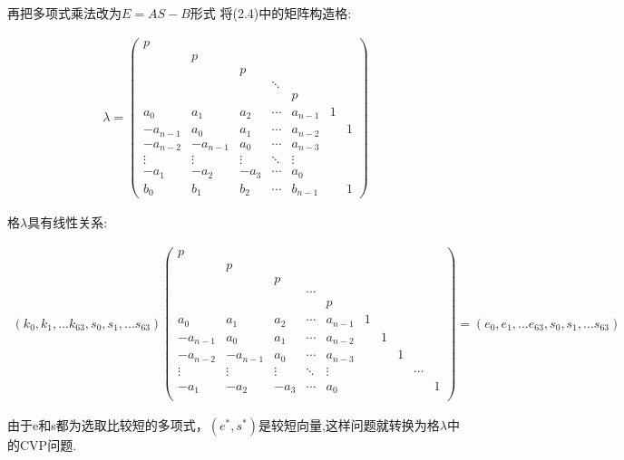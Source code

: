 \documentclass[12pt,a4paper]{article}
\numberwithin{equation}{section}
\begin{document}
再把多项式乘法改为$E=AS-B$形式
将(2.4)中的矩阵构造格:

\begin{align}
	\lambda=
	\left(
	\begin{smallmatrix}
		p        &          &        &        &         &   &   \\
		& p        &        &        &         &   &   \\
		&          & p      &        &         &   &   \\
		&          &        & \ddots &         &   &   \\
		&          &        &        & p       &   &   \\
		a_0      & a_1      & a_2    & \cdots & a_{n-1} & 1 &   \\
		-a_{n-1} & a_0      & a_1    & \cdots & a_{n-2} &   & 1 \\
		-a_{n-2} & -a_{n-1} & a_0    & \cdots & a_{n-3} &   &   \\
		\vdots   & \vdots   & \vdots & \ddots & \vdots  &   &   \\
		-a_1     & -a_2     & -a_3   & \cdots & a_0     &   &   \\
		b_0      & b_1      & b_2    & \cdots & b_{n-1} &   & 1
	\end{smallmatrix}
	\right)
\end{align}

格$\lambda$具有线性关系:

\begin{align}
	(k_0,k_1,...k_{63},s_0,s_1,...s_{63})
	\left(
	\begin{smallmatrix}
			p\\
			&p\\
			&&p\\
			&&&\cdots\\
			&&&&p\\
			a_0    &a_1    &a_2   &\cdots &a_{n-1}            &1\\
			-a_{n-1}&a_0    &a_1   &\cdots &a_{n-2}       &&1\\
			-a_{n-2}&-a_{n-1}&a_0   &\cdots &a_{n-3}  &&&1\\
			\vdots &\vdots &\vdots&\ddots &\vdots             &&&&\cdots\\
			-a_1    &-a_2    &-a_3   &\cdots &a_0 &&&&&1\\
		\end{smallmatrix}
	\right)
	=
	(e_0,e_1,...e_{63},s_0,s_1,...s_{63})
\end{align}

由于e和s都为选取比较短的多项式，$(e^*,s^*)$是较短向量,这样问题就转换为格$\lambda$中的CVP问题.
\end{document}
